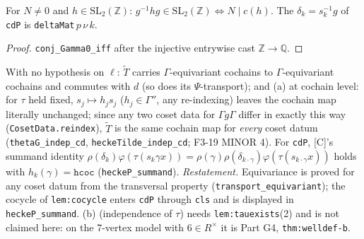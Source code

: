 \begin{lemma}\label{lem:conj-glq}
  \leanok
  For $N\ne0$ and $h\in\mathrm{SL}_2(\mathbb Z)$: $g^{-1}hg\in\mathrm{SL}_2(\mathbb Z)\iff N\mid c(h)$. The $\delta_k=s_k^{-1}g$ of
  \texttt{cdP} is \texttt{deltaMat}\,$p\,\nu\,k$.
\end{lemma}
\begin{proof}
  \leanok
  \texttt{conj\_Gamma0\_iff} after the injective entrywise cast $\mathbb Z\to\mathbb Q$.
\end{proof}

\begin{theorem}\label{thm:welldef-lean}
  \leanok
  With no hypothesis on $\ell$: $\widetilde T$ carries $\Gamma$-equivariant cochains to $\Gamma$-equivariant cochains and commutes
  with $d$ (so does its $\Psi$-transport); and (a) at cochain level: for $\tau$ held fixed, $s_j\mapsto h_js_j$ ($h_j\in\Gamma''$,
  any re-indexing) leaves the cochain map literally unchanged; since any two coset data for $\Gamma g\Gamma$ differ in exactly this
  way (\texttt{CosetData.reindex}), $\widetilde T$ is the same cochain map for \emph{every} coset datum (\texttt{thetaG\_indep\_cd},
  \texttt{heckeTilde\_indep\_cd}; F3-19 MINOR 4). For \texttt{cdP}, [C]'s summand identity
  $\rho(\delta_k)\varphi(\tau(s_k\gamma x))=\rho(\gamma)\rho(\delta_{k\cdot\gamma})\varphi(\tau(s_{k\cdot\gamma}x))$ holds with
  $h_k(\gamma)=\texttt{hcoc}$ (\texttt{heckeP\_summand}).
  \emph{Restatement.} Equivariance is proved for any coset datum from the transversal property (\texttt{transport\_equivariant});
  the cocycle of \texttt{lem:cocycle} enters \texttt{cdP} through \texttt{cls} and is displayed in \texttt{heckeP\_summand}.
  (b) (independence of $\tau$) needs \texttt{lem:tauexists}(2) and is not claimed here: on the 7-vertex model with
  $6\in R^\times$ it is Part G4, \texttt{thm:welldef-b}.
\end{theorem}
